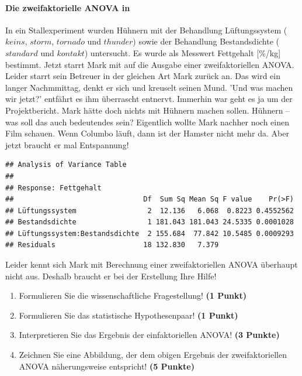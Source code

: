 \documentclass[a4paper, 9pt]{scrartcl}\usepackage[]{graphicx}\usepackage[]{xcolor}
\makeatletter
\newenvironment{kframe}{%
 \def\at@end@of@kframe{}%
 \ifinner\ifhmode%
  \def\at@end@of@kframe{\end{minipage}}%
  \begin{minipage}{\columnwidth}%
 \fi\fi%
 \def\FrameCommand##1{\hskip\@totalleftmargin \hskip-\fboxsep
 \colorbox{shadecolor}{##1}\hskip-\fboxsep
     \hskip-\linewidth \hskip-\@totalleftmargin \hskip\columnwidth}%
 \MakeFramed {\advance\hsize-\width
   \@totalleftmargin\z@ \linewidth\hsize
   \@setminipage}}%
 {\par\unskip\endMakeFramed%
 \at@end@of@kframe}
\newenvironment{knitrout}{}{} %
\makeatother
\begin{document}
\paragraph{Die zweifaktorielle ANOVA in \Rlogo}

In ein Stallexperiment wurden Hühnern mit der Behandlung Lüftungssystem ($keins$, $storm$, $tornado$ und $thunder$) sowie der Behandlung Bestandsdichte ($standard$ und $kontakt$) untersucht. Es wurde als Messwert Fettgehalt [\%/kg] bestimmt. Jetzt starrt Mark mit auf die \Rlogo Ausgabe einer zweifaktoriellen ANOVA. Leider starrt sein Betreuer in der gleichen Art Mark zurück an. Das wird ein langer Nachmmittag, denkt er sich und kreuselt seinen Mund. 'Und was machen wir jetzt?' entfährt es ihm überrascht entnervt. Immerhin war geht es ja um der Projektbericht. Mark hätte doch nichts mit Hühnern machen sollen. Hühnern -- was soll das auch bedeutendes sein? Eigentlich wollte Mark nachher noch einen Film schauen. Wenn Columbo läuft, dann ist der Hamster nicht mehr da. Aber jetzt braucht er mal Entspannung!

\begin{knitrout}
\color{fgcolor}\begin{kframe}
\begin{verbatim}
## Analysis of Variance Table
## 
## Response: Fettgehalt
##                               Df  Sum Sq Mean Sq F value    Pr(>F)
## Lüftungssystem                 2  12.136   6.068  0.8223 0.4552562
## Bestandsdichte                 1 181.043 181.043 24.5335 0.0001028
## Lüftungssystem:Bestandsdichte  2 155.684  77.842 10.5485 0.0009293
## Residuals                     18 132.830   7.379
\end{verbatim}
\end{kframe}
\end{knitrout}

\vspace{1ex}

Leider kennt sich Mark mit Berechnung einer zweifaktoriellen ANOVA überhaupt nicht aus. Deshalb braucht er bei der Erstellung Ihre Hilfe! 

\begin{enumerate}
  \item Formulieren Sie die wissenschaftliche Fragestellung! \textbf{(1 Punkt)}
  \item Formulieren Sie das statistische Hypothesenpaar! \textbf{(1 Punkt)}
\item Interpretieren Sie das Ergebnis der einfaktoriellen ANOVA! \textbf{(3 Punkte)} 
\item Zeichnen Sie eine Abbildung, der dem obigen Ergebnis der
  zweifaktoriellen ANOVA näherungsweise entspricht! \textbf{(5 Punkte)}
\end{enumerate}
 
\end{document}
